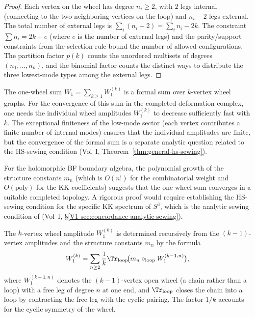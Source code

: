 \begin{proof}
Each vertex on the wheel has degree $n_i \geq 2$, with $2$ legs internal (connecting
to the two neighboring vertices on the loop) and $n_i - 2$ legs external. The total
number of external legs is $\sum_i (n_i - 2) = \sum_i n_i - 2k$. The constraint
$\sum n_i = 2k + e$ (where $e$ is the number of external legs) and the parity/support
constraints from the selection rule bound the number of allowed configurations. The
partition factor $p(k)$ counts the unordered multisets of degrees $(n_1, \ldots, n_k)$,
and the binomial factor counts the distinct ways to distribute the three lowest-mode
types among the external legs.
\end{proof}

\begin{remark}
The one-wheel sum $W_1 = \sum_{k \geq 1} W_1^{(k)}$ is a formal sum over
$k$-vertex wheel graphs. For the convergence of this sum in the completed
deformation complex, one needs the individual wheel amplitudes $W_1^{(k)}$ to
decrease sufficiently fast with $k$. The exceptional finiteness of the low-mode
sector (each vertex contributes a finite number of internal modes) ensures that
the individual amplitudes are finite, but the convergence of the formal sum is a
separate analytic question related to the HS-sewing condition
(Vol~I, Theorem~\ref*{thm:general-hs-sewing}).

For the holomorphic BF boundary algebra, the polynomial growth of the
structure constants $m_n$ (which is $O(n!)$ for the combinatorial weight and
$O(\mathrm{poly})$ for the KK coefficients) suggests that the one-wheel sum
converges in a suitable completed topology. A rigorous proof would require
establishing the HS-sewing condition for the specific KK spectrum of $S^3$, which
is the analytic sewing condition of
(Vol~I, \S\ref*{V1-sec:concordance-analytic-sewing}).
\end{remark}

\begin{proposition}
\label{prop:recursive-wheel-determination}
The $k$-vertex wheel amplitude $W_1^{(k)}$ is determined recursively from the
$(k-1)$-vertex amplitudes and the structure constants $m_n$ by the formula
\begin{equation}
W_1^{(k)}
= \sum_{n \geq 2}
\frac{1}{k} \Tr_{\mathrm{loop}}\!\bigl(
m_n \circ_{\mathrm{loop}} W_1^{(k-1,n)}
\bigr),
\end{equation}
where $W_1^{(k-1,n)}$ denotes the $(k-1)$-vertex open wheel (a chain rather than a
loop) with a free leg of degree $n$ at one end, and $\Tr_{\mathrm{loop}}$ closes the
chain into a loop by contracting the free leg with the cyclic pairing. The factor
$1/k$ accounts for the cyclic symmetry of the wheel.
\end{proposition}

